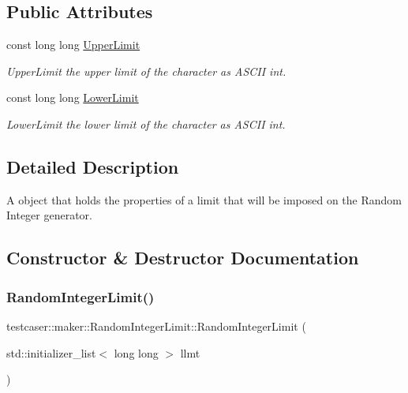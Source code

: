 \subsection*{Public Attributes}
\begin{DoxyCompactItemize}
\item 
const long long \mbox{\hyperlink{classtestcaser_1_1maker_1_1RandomIntegerLimit_a993debb42b11e472b19bcb2f2f5f2110}{Upper\+Limit}}
\begin{DoxyCompactList}\small\item\em Upper\+Limit the upper limit of the character as A\+S\+C\+II int. \end{DoxyCompactList}\item 
const long long \mbox{\hyperlink{classtestcaser_1_1maker_1_1RandomIntegerLimit_ad564182c528cdc7a96443c4a4febe1c1}{Lower\+Limit}}
\begin{DoxyCompactList}\small\item\em Lower\+Limit the lower limit of the character as A\+S\+C\+II int. \end{DoxyCompactList}\end{DoxyCompactItemize}


\subsection{Detailed Description}
A object that holds the properties of a limit that will be imposed on the Random Integer generator. 



\subsection{Constructor \& Destructor Documentation}
\mbox{\label{classtestcaser_1_1maker_1_1RandomIntegerLimit_ae70b7c715a632c4a079a0c37452decbf}} 
\subsubsection{\texorpdfstring{RandomIntegerLimit()}{RandomIntegerLimit()}\hspace{0.1cm}{\footnotesize\ttfamily [1/2]}}
{\footnotesize\ttfamily testcaser\+::maker\+::\+Random\+Integer\+Limit\+::\+Random\+Integer\+Limit (\begin{DoxyParamCaption}\item[{std\+::initializer\+\_\+list$<$ long long $>$}]{llmt }\end{DoxyParamCaption})\hspace{0.3cm}{\ttfamily [inline]}}



